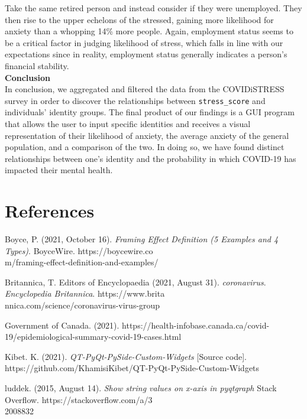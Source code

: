 \documentclass[fontsize=11pt]{article}
\begin{document}
    Take the same retired person and instead consider if they were unemployed. They then rise to the upper echelons of the stressed, gaining more likelihood for anxiety than a whopping 14\% more people. Again, employment status seems to be a critical factor in judging likelihood of stress, which falls in line with our expectations since in reality, employment status generally indicates a person’s financial stability. \\
    
    \textbf{Conclusion} \\
    In conclusion, we aggregated and filtered the data from the COVIDiSTRESS survey in order to discover the relationships between \texttt{stress\_score} and individuals’ identity groups. The final product of our findings is a GUI program that allows the user to input specific identities and receives a visual representation of their likelihood of anxiety, the average anxiety of the general population, and a comparison of the two. In doing so, we have found distinct relationships between one’s identity and the probability in which COVID-19 has impacted their mental health.

    \section*{References}

    \hangindent=0.7cm \noindent
    Boyce, P. (2021, October 16). \textit{Framing Effect Definition (5 Examples and 4 Types)}. BoyceWire.
    https://boycewire.co\\m/framing-effect-definition-and-examples/

    \hangindent=0.7cm \noindent
    Britannica, T. Editors of Encyclopaedia (2021, August 31). \textit{coronavirus}. \textit{Encyclopedia Britannica}.
    https://www.brita\\nnica.com/science/coronavirus-virus-group

    \hangindent=0.7cm \noindent
    Government of Canada. (2021).
    https://health-infobase.canada.ca/covid-19/epidemiological-summary-covid-19-cases.html

    \hangindent=0.7cm \noindent
    Kibet. K. (2021). \textit{QT-PyQt-PySide-Custom-Widgets} [Source code].
    https://github.com/KhamisiKibet/QT-PyQt-PySide-Custom-Widgets

    \hangindent=0.7cm \noindent
    luddek. (2015, August 14). \textit{Show string values on x-axis in pyqtgraph} Stack Overflow.
    https://stackoverflow.com/a/3\\2008832
\end{document}
